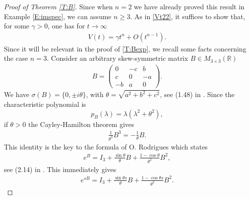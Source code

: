 \documentclass[11pt,letter]{amsart}
\def \R {\mathbb{R}}
\numberwithin{equation}{section}
\numberwithin{equation}{section}
\begin{document}
\begin{proof}[Proof of Theorem \ref{T:B}]
Since when $n=2$ we have already proved this result in Example \ref{E:imspec}, we can assume $n\ge 3$. 
As in \eqref{Vt22}, it suffices to show that, for some $\gamma>0$, one has for $t\to \infty$
\begin{align}\label{T:Bexp}
V(t)= \gamma t^{n}+O(t^{n-1}).
\end{align}
Since it will be relevant in the proof of \eqref{T:Bexp}, we recall some facts concerning the case $n=3$. 
Consider an arbitrary skew-symmetric matrix $B\in M_{3\times 3}(\R)$  
\begin{align*}
B=\begin{pmatrix}
0 & -c & b \\
c & 0 & -a \\
-b & a & 0
\end{pmatrix}.
\end{align*}
We have $\sigma(B)=\{0,\pm i \theta\}$, with $\theta=\sqrt{a^{2}+b^{2}+c^{2}}$, see (1.48) in \cite{McC}. Since the characteristic polynomial is 
\[
p_{B}(\lambda)=\lambda(\lambda^{2}+\theta^{2}),
\]
if $\theta>0$ the Cayley-Hamilton theorem gives
\begin{align*}
\frac{1}{\theta^3} B^3 =- \frac 1\theta B.
\end{align*}
This identity is the key to the formula of O. Rodrigues which states 
\begin{align}\label{rod}
e^{B}=I_{3}+\frac{\sin \theta}{\theta} B+\frac{1-\cos \theta}{\theta^2} B^{2},
\end{align}
see (2.14) in \cite{MuLiSa}. This  immediately gives 
\begin{align*}
e^{sB}=I_{3}+\frac{\sin \theta s}{\theta} B+\frac{1-\cos \theta s}{\theta^2} B^{2}.
\end{align*}


\end{proof}
\end{document}
